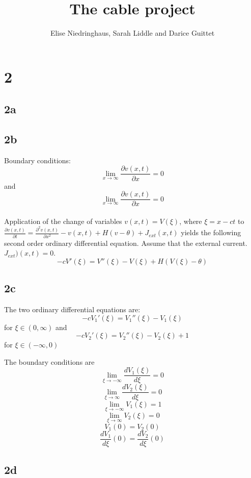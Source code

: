 \documentclass[11pt, oneside]{article}   	%
\title{The cable project}
\author{Elise Niedringhaus, Sarah Liddle and Darice Guittet}
\begin{document}
\maketitle
\section{2}
\subsection{2a}
\subsection{2b}
Boundary conditions:\\
$$\lim_{x\to\infty} \frac{\partial v(x,t)}{\partial x}=0$$ and $$\lim_{x\to\infty} \frac{\partial v(x,t)}{\partial x}=0$$\\
Application of the change of variables $v(x,t)=V(\xi)$, where $\xi=x-ct$ to $\frac{\partial v(x,t)}{\partial t}=\frac{\partial ^2 v(x,t)}{\partial x^2}-v(x,t)+H(v-\theta)+J_{ext}(x,t)$ yields the following second order ordinary differential equation. Assume that the external current. $J_{ext})(x,t)=0$.\\
\begin{equation}
\label{second order ODE}
-cV'(\xi)=V''(\xi)-V(\xi)+H(V(\xi)-\theta)
\end{equation}
\subsection{2c}

The two ordinary differential equations are:\\
\begin{equation}
\label{ODE1}
-cV_1'(\xi)=V_1''(\xi)-V_1(\xi)
\end{equation}
for  $\xi \in (0,\infty)$ and\\

\begin{equation}
\label{ODE2} 
-cV_2'(\xi)=V_2''(\xi)-V_2(\xi)+1
\end{equation}
for $\xi \in (-\infty,0)$

The boundary conditions are\\
$$\lim_{\xi\to-\infty} \frac{d V_1(\xi)}{d \xi}=0$$
$$\lim_{\xi\to\infty} \frac{d V_2(\xi)}{d \xi}=0$$
$$\lim_{\xi\to-\infty} V_1(\xi)=1$$
$$\lim_{\xi\to\infty} V_2(\xi)=0$$
$$V_1(0)=V_2(0)$$
$$\frac{d V_1}{d \xi}(0)=\frac{d V_2}{d \xi}(0)$$
\subsection{2d}
\end{document}
